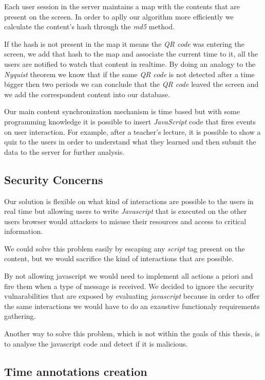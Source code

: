 	Each user session in the server maintains a map with the contents that are present on the screen. In order to aplly our algorithm more efficiently we calculate the content's hash through the \emph{md5} method.

	If the hash is not present in the map it means the \emph{QR code} was entering the screen, we add that hash to the map and associate the current time to it, all the users are notified to watch that content in realtime. By doing an analogy to the \emph{Nyquist} theorem we know that if the same \emph{QR code} is not detected after a time bigger then two periods we can conclude that the \emph{QR code} leaved the screen and we add the correspondent content into our database.

	Our main content synchronization mechanism is time based but with some programming knowledge it is possible to insert \emph{JavaScript} code that fires events on user interaction. For example, after a teacher's lecture, it is possible to show a quiz to the users in order to understand what they learned and then submit the data to the server for further analysis.

	\subsection{Security Concerns}

	Our solution is flexible on what kind of interactions are possible to the users in real time but allowing users to write \emph{Javascript} that is executed on the other users browser would attackers to misuse their resources and access to critical information.

	We could solve this problem easily by escaping any \emph{script} tag present on the content, but we would sacrifice the kind of interactions that are possible. 

	By not allowing javascript we would need to implement all actions a priori and fire them when a type of message is received. We decided to ignore the security vulnarabilities that are exposed by evaluating \emph{javascript} because in order to offer the same interactions we would have to do an exaustive functionaly requirements gathering.

	Another way to solve this problem, which is not within the goals of this thesis, is to analyse the javascript code and detect if it is malicious.


	\subsection{Time annotations creation}

